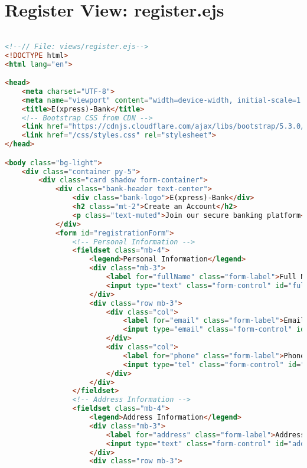 \section{Register View: register.ejs}
\begin{lstlisting}[language=HTML]

<!--// File: views/register.ejs-->
<!DOCTYPE html>
<html lang="en">

<head>
    <meta charset="UTF-8">
    <meta name="viewport" content="width=device-width, initial-scale=1.0">
    <title>E(xpress)-Bank</title>
    <!-- Bootstrap CSS from CDN -->
    <link href="https://cdnjs.cloudflare.com/ajax/libs/bootstrap/5.3.0/css/bootstrap.min.css" rel="stylesheet">
    <link href="/css/styles.css" rel="stylesheet">
</head>

<body class="bg-light">
    <div class="container py-5">
        <div class="card shadow form-container">
            <div class="bank-header text-center">
                <div class="bank-logo">E(xpress)-Bank</div>
                <h2 class="mt-2">Create an Account</h2>
                <p class="text-muted">Join our secure banking platform</p>
            </div>
            <form id="registrationForm">
                <!-- Personal Information -->
                <fieldset class="mb-4">
                    <legend>Personal Information</legend>
                    <div class="mb-3">
                        <label for="fullName" class="form-label">Full Name</label>
                        <input type="text" class="form-control" id="fullName" required>
                    </div>
                    <div class="row mb-3">
                        <div class="col">
                            <label for="email" class="form-label">Email</label>
                            <input type="email" class="form-control" id="email" required>
                        </div>
                        <div class="col">
                            <label for="phone" class="form-label">Phone Number</label>
                            <input type="tel" class="form-control" id="phone" required>
                        </div>
                    </div>
                </fieldset>
                <!-- Address Information -->
                <fieldset class="mb-4">
                    <legend>Address Information</legend>
                    <div class="mb-3">
                        <label for="address" class="form-label">Address</label>
                        <input type="text" class="form-control" id="address" required>
                    </div>
                    <div class="row mb-3">

\end{lstlisting}
